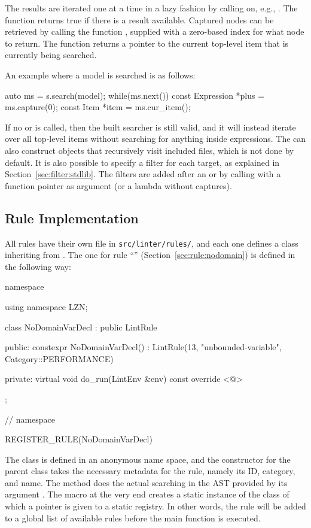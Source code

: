 \documentclass[a4paper,12pt]{article}
\newcommand{\ruleref}[1]{``\nameref{sec:rule:#1}'' (Section~\ref{sec:rule:#1})}
\begin{document}
The results are iterated one at a time in a lazy fashion by calling  on, e.g.,
. The function returns true if there is a result available. Captured
nodes can be retrieved by calling the function , supplied with a zero-based
index for what node to return. The function  returns a pointer to the
current top-level item that is currently being searched.

An example where a model is searched is as follows:
\begin{cppp}[style=nonumbers]
auto ms = s.search(model);
while(ms.next()) {
  const Expression *plus = ms.capture(0);
  const Item *item = ms.cur_item();
}
\end{cppp}

If no  or  is called, then the built searcher is still valid, and it will instead
iterate over all top-level items without searching for anything inside expressions.
The  can also construct  objects that recursively visit
included files, which is not done by default. It is also possible to specify a filter for each target, as
explained in Section~\ref{sec:filter:stdlib}. The filters are added after an 
or  by calling  with a function pointer as argument (or a lambda
without captures).

\fussy %
\subsection{Rule Implementation}\label{sec:impl:rules}
All rules have their own file in \texttt{src/linter/rules/}, and each one defines a class
inheriting from . The one for rule \ruleref{nodomain} is defined in the following way:
\begin{cppp}
namespace {
using namespace LZN;

class NoDomainVarDecl : public LintRule {
public:
  constexpr NoDomainVarDecl()
     : LintRule(13, "unbounded-variable", 
                Category::PERFORMANCE) {}

private:
  virtual void do_run(LintEnv &env) const override {<@\dots@>}
};

} // namespace

REGISTER_RULE(NoDomainVarDecl)
\end{cppp}
The class is defined in an anonymous name space, and the constructor for the parent class takes
the necessary metadata for the rule, namely its ID, category, and name. The method  does the
actual searching in the AST provided by its argument . The macro at the very end
creates a static instance of the class of which a pointer is given to a static registry.
In other words, the rule will be added to a global list of available rules before the main
function is executed.
\end{document}
